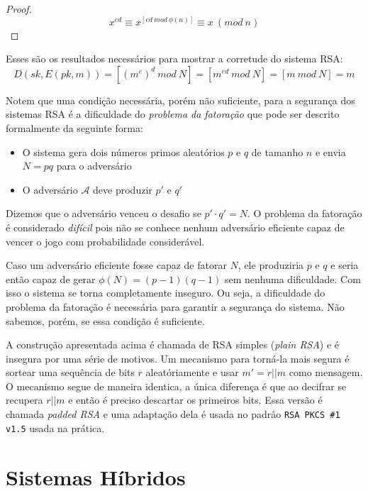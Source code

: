 \begin{proof}
  \begin{displaymath}
    x^{ed} \equiv x^{[ed\ mod\ \phi(n)]} \equiv x\ (mod\ n)
  \end{displaymath}
\end{proof}

Esses são os resultados necessários para mostrar a corretude do sistema RSA:
\begin{displaymath}
D(sk, E(pk, m)) = [(m^e)^d\ mod\ N] = [m^{ed}\ mod\ N] = [m\ mod\ N] = m  
\end{displaymath}

Notem que uma condição necessária, porém não suficiente, para a segurança dos sistemas RSA é a dificuldade do {\em problema da fatoração} que pode ser descrito formalmente da seguinte forma:
\begin{itemize}
\item O sistema gera dois números primos aleatórios $p$ e $q$ de tamanho $n$ e envia $N = pq$ para o adversário
\item O adversário $\mathcal{A}$ deve produzir $p'$ e $q'$
\end{itemize}

Dizemos que o adversário venceu o desafio se $p' \cdot q' = N$.
O problema da fatoração é considerado {\em difícil} pois não se conhece nenhum adversário eficiente capaz de vencer o jogo com probabilidade considerável.

Caso um adversário eficiente fosse capaz de fatorar $N$, ele produziria $p$ e $q$ e seria então capaz de gerar $\phi(N) = (p-1)(q-1)$ sem nenhuma dificuldade.
Com isso o sistema se torna completamente inseguro.
Ou seja, a dificuldade do problema da fatoração é necessária para garantir a segurança do sistema.
Não sabemos, porém, se essa condição é suficiente.

A construção apresentada acima é chamada de RSA simples ({\em plain RSA}) e é insegura por uma série de motivos.
Um mecanismo para torná-la mais segura é sortear uma sequência de bits $r$ aleatóriamente e usar $m' = r||m$ como mensagem.
O mecanismo segue de maneira identica, a única diferença é que ao decifrar se recupera $r||m$ e então é preciso descartar os primeiros bits.
Essa versão é chamada {\em padded RSA} e uma adaptação dela é usada no padrão {\tt RSA PKCS \#1 v1.5} usada na prática.

\section{Sistemas Híbridos}
\label{sec:sistemas-hibridos}

